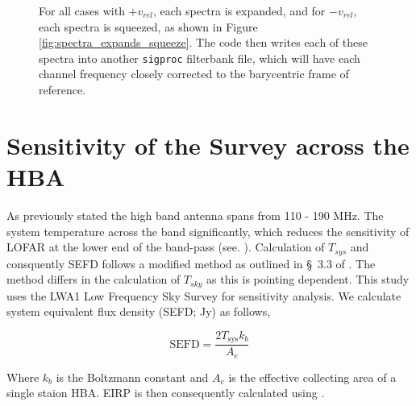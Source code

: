 \begin{figure}[htbp]
{For all cases with $+v_{rel}$, each spectra is expanded, and for $-v_{rel}$, each spectra is squeezed, as shown in Figure \ref{fig:spectra_expands_squeeze}. 
The code then writes each of these spectra into another \texttt{sigproc}  filterbank file, which will have each channel frequency closely corrected to the barycentric frame of reference.}  
\label{fig:code_outline}
\end{figure}


\section{Sensitivity of the Survey across the HBA}
\label{SEC2:A2}
As previously stated the high band antenna spans from 110 - 190 MHz. The system temperature across the band significantly, which reduces the sensitivity of LOFAR at the lower end of the band-pass (see. ). Calculation of $T_{sys}$ and consquently SEFD follows a modified method as outlined in \S~3.3 of \cite{mckenna_census_2024}. The method differs in the calculation of $T_{sky}$ as this is pointing dependent. This study uses the LWA1 Low Frequency Sky Survey \citep{LWA-survey} for sensitivity analysis. We calculate system equivalent flux density (SEFD; Jy) as follows, 

\begin{equation}
    \text{SEFD} = \frac{2 T_{\text{sys}} k_b}{A_e}
\end{equation}

Where $k_b$ is the Boltzmann constant and $A_e$ is the effective collecting area of a single staion HBA. EIRP is then consequently calculated using .

